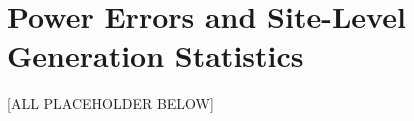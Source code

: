 \section{Power Errors and Site-Level Generation Statistics}
\label{sec:power_errors_site_stats}

[ALL PLACEHOLDER BELOW]